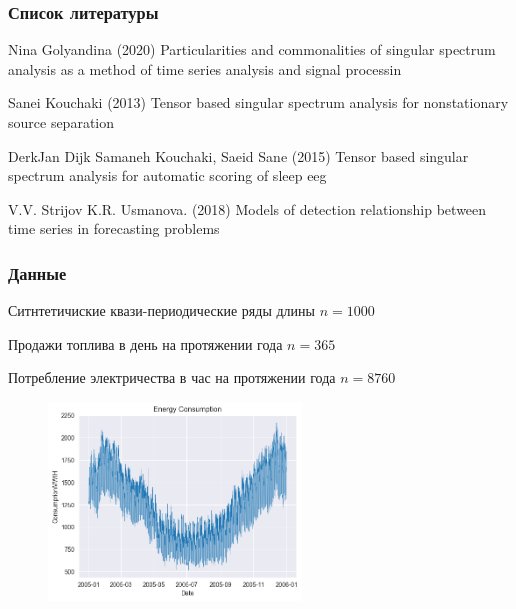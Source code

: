 \documentclass[
	11pt, %
]{beamer}
\begin{document}
\begin{frame} 
	\frametitle{Список литературы}
	
	\begin{thebibliography}{99} 
		\footnotesize
		
			Nina Golyandina (2020)
			\newblock Particularities and commonalities of singular spectrum analysis as a method of time
			series analysis and signal processin

			Sanei Kouchaki (2013)
			\newblock Tensor based singular spectrum analysis for nonstationary source separation

		   	DerkJan Dijk Samaneh Kouchaki, Saeid Sane (2015)
			\newblock Tensor based singular spectrum analysis for automatic scoring of sleep eeg

		   	V.V. Strijov K.R. Usmanova. (2018)
			\newblock Models of detection relationship between time series in forecasting problems

	\end{thebibliography}
\end{frame}

\begin{frame}
    \frametitle{Данные}
\scriptsize

Ситнтетичиские квази-периодические ряды длины \(n = 1000\)

Продажи топлива в день на протяжении года \(n = 365\)

Потребление электричества в час на протяжении года \(n = 8760\)

\begin{figure}
	\centering
	\includegraphics[width=0.6\textwidth]{images/energy.png}
	\label{fig:test}
\end{figure}

\end{frame}
\end{document}

